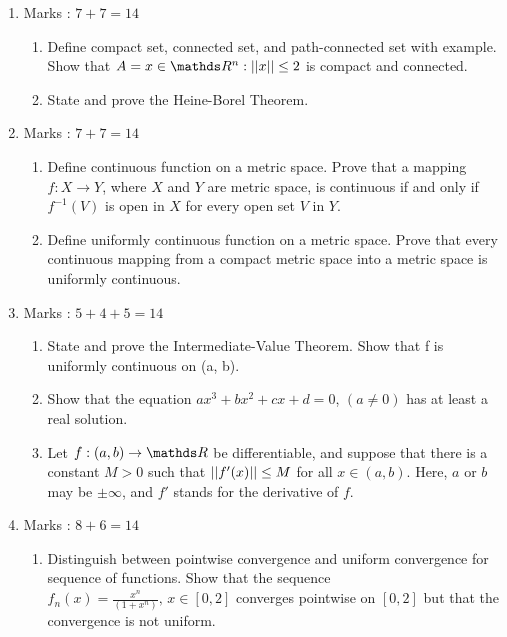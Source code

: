 \documentclass[../main-sheet.tex]{subfiles}
\begin{document}
\begin{enumerate}
\begin{enumerate}
            \end{enumerate}
        \item Marks : $ 7+7=14 $
              \begin{enumerate}
                  \item Define compact set, connected set, and path-connected set with example. Show that $ A = {x \in \R^n : \norm{x} \leq 2} $ is compact and connected.
                  \item State and prove the Heine-Borel Theorem.
            \end{enumerate}
        \item Marks : $ 7+7=14 $
              \begin{enumerate}
                  \item Define continuous function on a metric space. Prove that a mapping $ f:X \to  Y $, where $ X $ and $ Y $ are metric space, is continuous if and only if $ f^{-1}(V) $ is open in $ X $ for every open set $ V $ in $ Y $.
                  \item Define uniformly continuous function on a metric space. Prove that every continuous mapping from a compact metric space into a metric space is uniformly continuous.
            \end{enumerate}
        \item Marks : $ 5+4+5=14 $
              \begin{enumerate}
                  \item State and prove the Intermediate-Value Theorem.
                  Show that f is uniformly continuous on (a, b).
                  \item Show that the equation $ ax^3 + bx^2 + cx + d = 0 $, $ (a \neq 0) $ has at least a real solution.
                  \item Let $ f: (a,b) \to \R $ be differentiable, and suppose that there is a constant $ M > 0 $ such that $ \left\vert\left\vert f'(x)\right\vert\right\vert \leq M $ for all $ x \in (a,b) $. Here, $ a $ or $ b $ may be $ \pm \infty $, and $ f' $ stands for the derivative of $ f $.
            \end{enumerate}
        \item Marks : $ 8+6=14 $
              \begin{enumerate}
                  \item Distinguish between pointwise convergence and uniform convergence for sequence of functions. Show that the sequence $ f_n (x) = \frac{x^n}{(1+x^n)},\,x \in [0,2] $ converges pointwise on $ [0,2] $ but that the convergence is not uniform.

\end{enumerate}
\end{enumerate}
\end{document}
